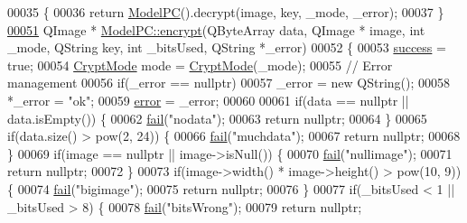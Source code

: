 \begin{DoxyCode}
00035 \{
00036     \textcolor{keywordflow}{return} \hyperlink{class_model_p_c_ae12ebe65ec973c02a0de4850a7c1e31c}{ModelPC}().decrypt(image, key, \_mode, \_error);
00037 \}
\hypertarget{modelpc_8cpp_source.tex_l00051}{}\hyperlink{class_model_p_c_a6f191f62d4635d0d3555fcc0be298794}{00051} QImage * \hyperlink{class_model_p_c_a6f191f62d4635d0d3555fcc0be298794}{ModelPC::encrypt}(QByteArray data, QImage * image, \textcolor{keywordtype}{int} \_mode, QString key, \textcolor{keywordtype}{int} 
      \_bitsUsed, QString *\_error)
00052 \{
00053     \hyperlink{class_model_p_c_a945ffbbc44a832b953c191debd448f4c}{success} = \textcolor{keyword}{true};
00054     \hyperlink{class_model_p_c_a296dd7afe3e1c49b3da25fd644fe4ceb}{CryptMode} mode = \hyperlink{class_model_p_c_a296dd7afe3e1c49b3da25fd644fe4ceb}{CryptMode}(\_mode);
00055     \textcolor{comment}{// Error management}
00056     \textcolor{keywordflow}{if}(\_error == \textcolor{keyword}{nullptr})
00057         \_error = \textcolor{keyword}{new} QString();
00058     *\_error = \textcolor{stringliteral}{"ok"};
00059     \hyperlink{class_model_p_c_a4e5a9c0ca1f06fe5bc478b6bf248c37c}{error} = \_error;
00060 
00061     \textcolor{keywordflow}{if}(data == \textcolor{keyword}{nullptr} || data.isEmpty()) \{
00062         \hyperlink{class_model_p_c_a47464b59b7e37fcee25e55475708aabd}{fail}(\textcolor{stringliteral}{"nodata"});
00063         \textcolor{keywordflow}{return} \textcolor{keyword}{nullptr};
00064     \}
00065     \textcolor{keywordflow}{if}(data.size() > pow(2, 24)) \{
00066         \hyperlink{class_model_p_c_a47464b59b7e37fcee25e55475708aabd}{fail}(\textcolor{stringliteral}{"muchdata"});
00067         \textcolor{keywordflow}{return} \textcolor{keyword}{nullptr};
00068     \}
00069     \textcolor{keywordflow}{if}(image == \textcolor{keyword}{nullptr} || image->isNull()) \{
00070         \hyperlink{class_model_p_c_a47464b59b7e37fcee25e55475708aabd}{fail}(\textcolor{stringliteral}{"nullimage"});
00071         \textcolor{keywordflow}{return} \textcolor{keyword}{nullptr};
00072     \}
00073     \textcolor{keywordflow}{if}(image->width() * image->height() > pow(10, 9)) \{
00074         \hyperlink{class_model_p_c_a47464b59b7e37fcee25e55475708aabd}{fail}(\textcolor{stringliteral}{"bigimage"});
00075         \textcolor{keywordflow}{return} \textcolor{keyword}{nullptr};
00076     \}
00077     \textcolor{keywordflow}{if}(\_bitsUsed < 1 || \_bitsUsed > 8) \{
00078         \hyperlink{class_model_p_c_a47464b59b7e37fcee25e55475708aabd}{fail}(\textcolor{stringliteral}{"bitsWrong"});
00079         \textcolor{keywordflow}{return} \textcolor{keyword}{nullptr};

\end{DoxyCode}

